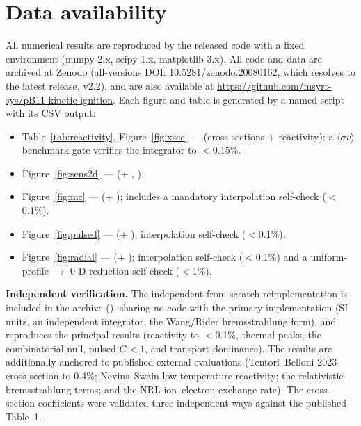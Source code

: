 \documentclass[aip,pop,reprint,amsmath,amssymb,floatfix]{revtex4-2}
\begin{document}
\section{Data availability}

All numerical results are reproduced by the released code with a fixed environment (numpy 2.x, scipy 1.x, matplotlib 3.x). All code and data are archived at Zenodo (all-versions DOI: 10.5281/zenodo.20080162, which resolves to the latest release, v2.2), and are also available at \url{https://github.com/msyrt-sys/pB11-kinetic-ignition}. Each figure and table is generated by a named script with its CSV output:
\begin{itemize}
\item Table~\ref{tab:reactivity}, Figure~\ref{fig:xsec} ---  (cross sections + reactivity); a $\langle\sigma v\rangle$ benchmark gate verifies the integrator to $<$0.15\%.
\item Figure~\ref{fig:sens2d} ---  (+ , ).
\item Figure~\ref{fig:mc} ---  (+ ); includes a mandatory interpolation self-check ($<$0.1\%).
\item Figure~\ref{fig:pulsed} ---  (+ ); interpolation self-check ($<$0.1\%).
\item Figure~\ref{fig:radial} ---  (+ ); interpolation self-check ($<$0.1\%) and a uniform-profile $\to$ 0-D reduction self-check ($<$1\%).
\end{itemize}

\textbf{Independent verification.} The independent from-scratch reimplementation is included in the archive (), sharing no code with the primary implementation (SI units, an independent integrator, the Wang/Rider bremsstrahlung form), and reproduces the principal results (reactivity to $<$0.1\%, thermal peaks, the combinatorial null, pulsed $G<1$, and transport dominance). The results are additionally anchored to published external evaluations (Tentori--Belloni 2023 cross section to 0.4\%; Nevins--Swain low-temperature reactivity; the relativistic bremsstrahlung terms\cite{brems}; and the NRL ion--electron exchange rate). The cross-section coefficients were validated three independent ways against the published Table~1.
\end{document}
